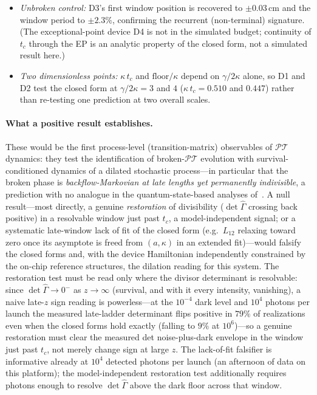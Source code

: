 \documentclass[11pt]{article}
\newcommand{\PT}{\mathcal{PT}}
\begin{document}
\begin{itemize}
$0.009$ as simulated at $10^{6}$, the dark floor slightly suppressing it---%
rather than pure noise) versus $0.49$ for D3
(unbroken), while the fitted floor is $\ge24\sigma$ negative for D1/D2:
the dissociation is resolved with more than an order of magnitude of
margin.
\item \emph{Unbroken control:} D3's first window position is
recovered to $\pm0.03\,$cm and the window period to $\pm2.3\%$,
confirming the recurrent (non-terminal) signature. (The
exceptional-point device D4 is not in the simulated budget; continuity
of $t_c$ through the EP is an analytic property of the closed form, not
a simulated result here.)
\item \emph{Two dimensionless points:} $\kappa\,t_c$ and
$\mathrm{floor}/\kappa$ depend on $\gamma/2\kappa$ alone, so D1 and D2
test the closed form at $\gamma/2\kappa=3$ and $4$
($\kappa\,t_c=0.510$ and $0.447$) rather than re-testing one
prediction at two overall scales.
\end{itemize}

\paragraph{What a positive result establishes.} These would be the
first process-level (transition-matrix) observables of $\PT$ dynamics:
they test the identification of broken-$\PT$ evolution with
survival-conditioned dynamics of a dilated stochastic process---in
particular that the broken phase is \emph{backflow-Markovian at
late lengths yet permanently indivisible}, a prediction with no analogue in the
quantum-state-based analyses of~\cite{Xiao2019,KAU2017}. A null
result---most directly, a genuine \emph{restoration} of divisibility
($\det\hat\Gamma$ crossing back positive) in a resolvable window just
past $t_c$, a model-independent signal; or a systematic late-window
lack of fit of the closed form
(e.g.\ $L_{12}$ relaxing toward zero once its asymptote is freed from
$(a,\kappa)$ in an extended fit)---would falsify the closed forms and,
with the device Hamiltonian independently constrained by the on-chip
reference structures, the dilation reading for this system. The
restoration test must be read only where the divisor determinant is
resolvable: since $\det\hat\Gamma\to0^-$ as $z\to\infty$ (survival, and
with it every intensity, vanishing), a naive late-$z$ sign reading is
powerless---at the $10^{-4}$ dark level and $10^{4}$ photons per launch
the measured late-ladder
determinant flips positive in $79\%$ of realizations even when the closed
forms hold exactly (falling to $9\%$ at $10^{6}$)---so a genuine restoration must clear the measured
det noise-plus-dark envelope in the window just past $t_c$, not merely
change sign at large $z$. The lack-of-fit falsifier is informative
already at $10^4$ detected photons per launch (an afternoon of data on
this platform); the model-independent restoration test additionally
requires photons enough to resolve $\det\hat\Gamma$ above the dark
floor across that window.
\end{document}
